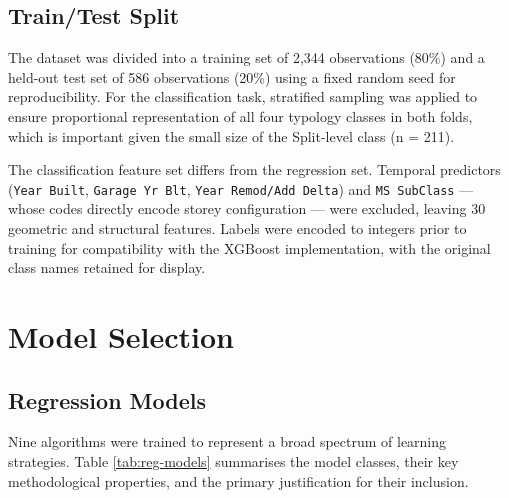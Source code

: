 \documentclass[11pt,a4paper]{article}
\let\oldsection\section
\renewcommand{\section}{\clearpage\oldsection}
\begin{document}
\subsection{Train/Test Split}\label{traintest-split}

The dataset was divided into a training set of 2,344 observations (80\%)
and a held-out test set of 586 observations (20\%) using a fixed random
seed for reproducibility. For the classification task, stratified
sampling was applied to ensure proportional representation of all four
typology classes in both folds, which is important given the small size
of the Split-level class (n = 211).

The classification feature set differs from the regression set. Temporal
predictors (\texttt{Year\ Built}, \texttt{Garage\ Yr\ Blt},
\texttt{Year\ Remod/Add\ Delta}) and \texttt{MS\ SubClass} --- whose
codes directly encode storey configuration --- were excluded, leaving 30
geometric and structural features. Labels were encoded to integers prior
to training for compatibility with the XGBoost implementation, with the
original class names retained for display.

\section{Model Selection}\label{model-selection}

\subsection{Regression Models}\label{regression-models}

Nine algorithms were trained to represent a broad spectrum of learning
strategies. Table \ref{tab:reg-models} summarises the model classes,
their key methodological properties, and the primary justification for
their inclusion.
\end{document}
